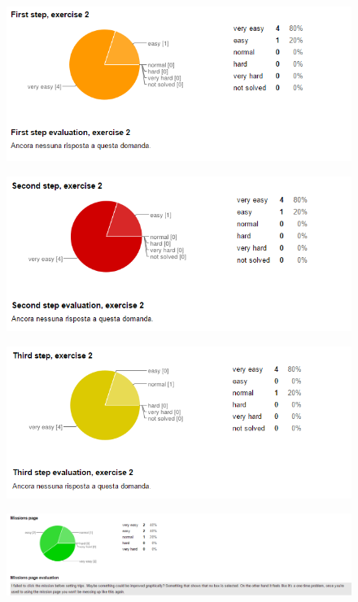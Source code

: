  \begin{figure}[H]
   \centering
   \includegraphics[width=\linewidth]{pictures/survey8.png}
 \end{figure}

 \begin{figure}[H]
   \centering
   \includegraphics[width=\linewidth]{pictures/survey9.png}
 \end{figure}

 \begin{figure}[H]
   \centering
   \includegraphics[width=\linewidth]{pictures/survey10.png}
 \end{figure}

 \begin{figure}[H]
   \centering
   \includegraphics[width=\linewidth]{pictures/survey11.png}
 \end{figure}

